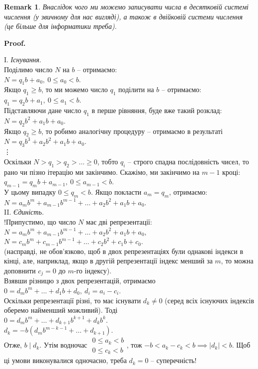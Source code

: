 \documentclass[a4paper, 14pt]{extarticle}
\makeatletter
\theoremstyle{theoremdd}
\theoremstyle{theoremdd}
\theoremstyle{theoremdd}
\theoremstyle{theoremdd}
\theoremstyle{theoremdd}
\theoremstyle{theoremdd}
\newtheorem{remark}[theorem]{Remark}
\theoremstyle{theoremdd}
\theoremstyle{theoremdd}
\def\qed{$\blacksquare$}
\renewenvironment{proof}[1][Proof.\\]{\par
\pushQED{\hfill \qed}%
\normalfont \topsep6\p@\@plus6\p@\relax
\trivlist
\item\relax
{\bfseries
#1\@addpunct{.}}\hspace\labelsep\ignorespaces
}{%
\popQED\endtrivlist\@endpefalse
}
\makeatother
\begin{document}
\begin{remark}
Внаслідок чого ми можемо записувати числа в десятковій системі числення (у звичному для нас вигляді), а також в двійковій системи числення (це більше для інформатики треба).
\end{remark}

\begin{proof}
I. \textit{Існування}.\\
Поділимо число $N$ на $b$ -- отримаємо:\\
$N = q_1 b + a_0,\ 0 \leq a_0 < b$.\\
Якщо $q_1 \geq b$, то ми можемо число $q_1$ поділити на $b$ -- отримаємо:\\
$q_1 = q_2 b + a_1,\ 0 \leq a_1 < b$.\\
Підставляючи дане число $q_1$ в перше рівняння, буде вже такий розклад:\\
$N = q_2b^2 + a_1b + a_0$.\\
Якщо $q_2 \geq b$, то робимо аналогічну процедуру -- отримаємо в результаті\\
$N = q_3 b^3 + a_2 b^2 + a_1 b + a_0$.\\
\vdots \\
Оскільки $N > q_1 > q_2 > \dots \geq 0$, тобто $q_i$ -- строго спадна послідовність чисел, то рано чи пізно ітерацію ми закінчимо. Скажімо, ми закінчимо на $m-1$ кроці:\\
$q_{m-1} = q_m b + a_{m-1},\ 0 \leq a_{m-1} < b$.\\
У цьому випадку $0 \leq q_m < b$. Якщо покласти $a_m = q_m$, отримаємо:\\
$N = a_m b^m + a_{m-1} b^{m-1} + \dots + a_2 b^2 + a_1 b + a_0$.
\bigskip \\
II. \textit{Єдиність.}\\
!Припустимо, що число $N$ має дві репрезентації:\\
$N = a_m b^m + a_{m-1} b^{m-1} + \dots + a_2 b^2 + a_1 b + a_0$,\\
$N = c_m b^m + c_{m-1} b^{m-1} + \dots + c_2 b^2 + c_1 b + c_0$.\\
(насправді, не обов'язково, щоб в двох репрезентаціях були однакові індекси в кінці, але, наприклад, якщо в другій репрезентації індекс менший за $m$, то можна доповнити $c_j = 0$ до $m$-го індексу).\\
Взявши різницю з двох репрезентацій, отримаємо\\
$0 = d_m b^m + \dots + d_1 b + d_0,\ d_i = a_i - c_i$.\\
Оскільки репрезентації різні, то має існувати $d_k \neq 0$ (серед всіх існуючих індексів оберемо найменший можливий). Тоді\\
$0 = d_mb^m + \dots + d_{k+1}b^{k+1} + d_k b^k$.\\
$d_k = -b(d_m b^{m-k-1} + \dots + d_{k+1})$.\\
Отже, $b \mid d_k$. Утім водночас $\begin{gathered} 0 \leq a_k < b \\ 0 \leq c_k < b \end{gathered}$, тож $-b < a_k - c_k < b \implies |d_k| < b$. Щоб ці умови виконувалися одночасно, треба $d_k = 0$ -- суперечність!
\end{proof}
\end{document}
